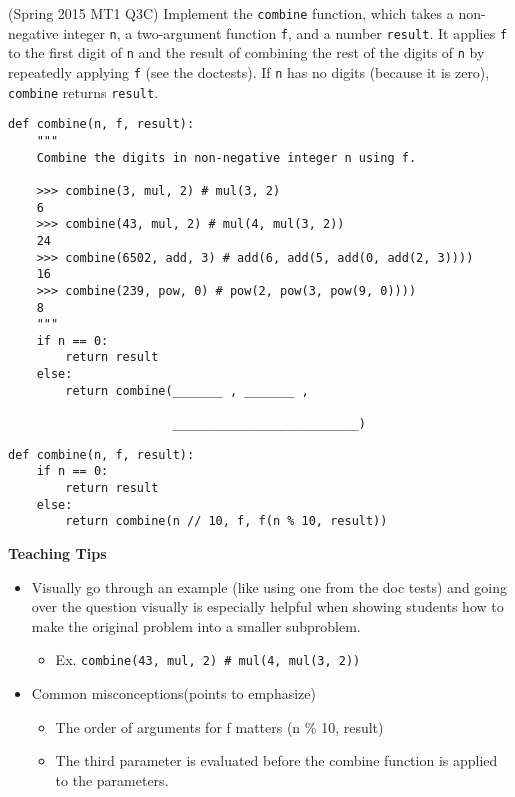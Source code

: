 \begin{blocksection}
\question (Spring 2015 MT1 Q3C) Implement the \lstinline$combine$ function, which takes a non-negative integer
\lstinline$n$, a two-argument function \lstinline$f$, and a number \lstinline$result$. It applies
\lstinline$f$ to the first digit of \lstinline$n$ and the result of combining the rest of the digits of \lstinline$n$
by repeatedly applying \lstinline$f$ (see the doctests). If \lstinline$n$ has no digits (because it is zero),
\lstinline$combine$ returns \lstinline$result$.

\begin{lstlisting}
def combine(n, f, result):
    """
    Combine the digits in non-negative integer n using f.
    
    >>> combine(3, mul, 2) # mul(3, 2)
    6
    >>> combine(43, mul, 2) # mul(4, mul(3, 2))
    24
    >>> combine(6502, add, 3) # add(6, add(5, add(0, add(2, 3))))
    16
    >>> combine(239, pow, 0) # pow(2, pow(3, pow(9, 0))))
    8
    """
    if n == 0:
        return result
    else:
        return combine(_______ , _______ , 
				               
                       __________________________)
\end{lstlisting}

\begin{solution}[1.5in]
\begin{lstlisting}
def combine(n, f, result):
    if n == 0:
        return result
    else:
        return combine(n // 10, f, f(n % 10, result))
\end{lstlisting}
\end{solution}
\end{blocksection}

\begin{blocksection}
\begin{guide}
    \textbf{Teaching Tips}
    \begin{itemize}
        \item Visually go through an example (like using one from the doc tests) and going over the question visually is especially helpful when showing students how to make the original problem into a smaller subproblem.
        \begin{itemize}
            \item Ex. \texttt{combine(43, mul, 2)  \# mul(4, mul(3, 2))}
        \end{itemize}
        \item Common misconceptions(points to emphasize)
        \begin{itemize}
            \item The order of arguments for f matters (n \% 10, result)
            \item The third parameter is evaluated before the combine function is applied to the parameters. 
        \end{itemize}
    \end{itemize}
\end{guide}
\end{blocksection}